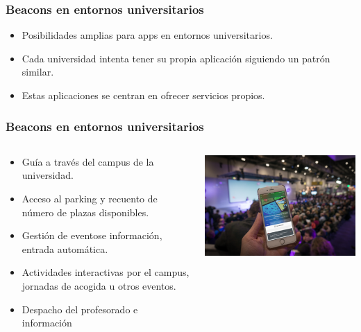 \begin{frame}
	\frametitle{Beacons en entornos universitarios}
				\begin{itemize}
					\item Posibilidades amplias para apps en entornos universitarios.
					\item Cada universidad intenta tener su propia aplicación siguiendo un patrón similar.
					\item Estas aplicaciones se centran en ofrecer servicios propios.
				\end{itemize}
			\endblock{}
\end{frame}


\begin{frame}
	\frametitle{Beacons en entornos universitarios}
		\begin{columns}
			\begin{column}{0.6\textwidth}
					\begin{itemize}
						\item Guía a través del campus de la universidad.
						\item Acceso al parking y recuento de número de plazas disponibles.
						\item Gestión de eventose información, entrada automática.
						\item Actividades interactivas por el campus, jornadas de acogida u otros eventos.
						\item Despacho del profesorado e información
					\end{itemize}
				\endblock{}
			\end{column}
			\begin{column}{0.4\textwidth}
				\vfill 
				\begin{center}
					\includegraphics[width=0.9\linewidth]{Images/BeaconEvent}
				\end{center}
			\end{column}		
		\end{columns}
\end{frame}


